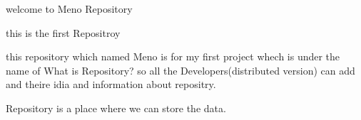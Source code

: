 welcome to Meno Repository

this is the first Repositroy 

this repository which named Meno is for my first project whech is under the name of What is Repository? so all the Developers(distributed version) can add and theire idia and information about repositry.

Repository is a place where we can store the data.
